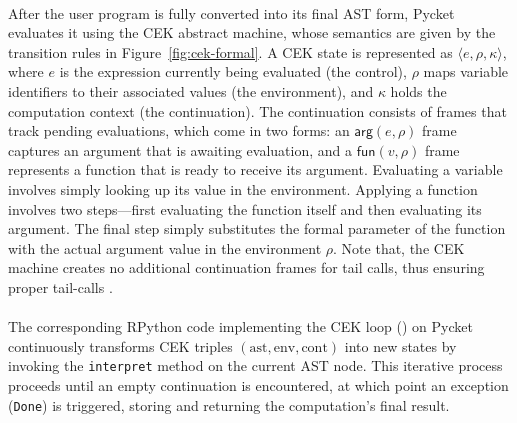         \paragraph{}%
            After the user program is fully converted into its final AST form, Pycket evaluates it using the CEK abstract machine, whose semantics are given by the transition rules in Figure~\ref{fig:cek-formal}. A CEK state is represented as $\langle e,\rho,\kappa\rangle$, where $e$ is the expression currently being evaluated (the control), $\rho$ maps variable identifiers to their associated values (the environment), and $\kappa$ holds the computation context (the continuation). The continuation consists of frames that track pending evaluations, which come in two forms: an $\mathsf{arg}(e,\rho)$ frame captures an argument that is awaiting evaluation, and a $\mathsf{fun}(v,\rho)$ frame represents a function that is ready to receive its argument. Evaluating a variable involves simply looking up its value in the environment. Applying a function involves two steps—first evaluating the function itself and then evaluating its argument. The final step simply substitutes the formal parameter of the function with the actual argument value in the environment $\rho$. Note that, the CEK machine creates no additional continuation frames for tail calls, thus ensuring proper tail-calls \cite{pycketmain}.

        \paragraph{}%
            The corresponding RPython code implementing the CEK loop () on Pycket continuously transforms CEK triples $(\text{ast}, \text{env}, \text{cont})$ into new states by invoking the \texttt{interpret} method on the current AST node. This iterative process proceeds until an empty continuation is encountered, at which point an exception (\texttt{Done}) is triggered, storing and returning the computation’s final result.



